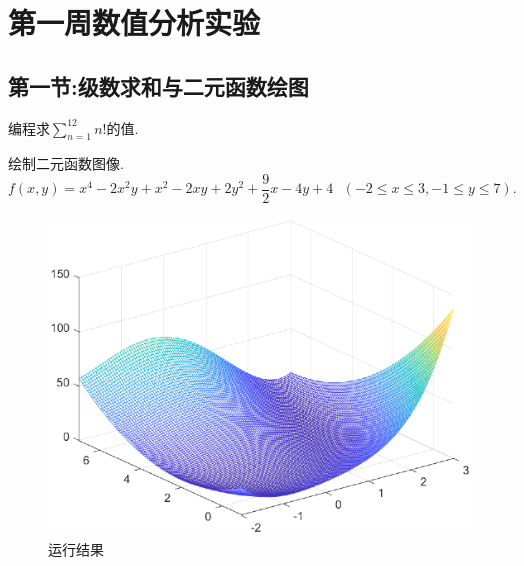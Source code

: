 \section{第一周数值分析实验}
\subsection{第一节:级数求和与二元函数绘图}
\begin{ex}
编程求$\sum_{n=1}^{12}{n!}$的值.
\end{ex}

\begin{ex}
绘制二元函数图像.
$$
f(x,y)=x^4-2x^2y+x^2-2xy+2y^2+\frac{9}{2}x-4y+4\,\,\,\,\left( -2\le x\le 3,-1\le y\le 7 \right) .
$$
\end{ex}

\qa 
\begin{figure}[H]
	\centering
	\includegraphics[width = 0.6\linewidth]{day1/q2.eps}
	\caption{运行结果}
\end{figure}
